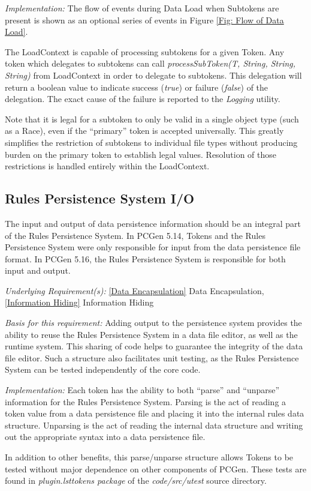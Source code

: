 \documentclass[12pt,letterpaper]{article}
\newcommand{\pcgenversEOS}{5.16}
\newcommand{\systemEOS}{Rules Persistence System}
\newcommand{\system}{\systemEOS{} }
\newcommand{\textem}[1]{\emph{#1}}
\newcommand{\lsubsection}[1]{\label{#1}\subsection{#1}}
\newcommand{\myref}[1]{\ref{#1} #1}
\newcommand{\basis}{\noindent\textem{Basis for this requirement:} }
\newcommand{\impl}{\noindent\textem{Implementation:} }
\newcommand{\under}{\noindent\textem{Underlying Requirement(s):} }
\begin{document}
\impl The flow of events during Data Load when Subtokens are present is shown as an optional
series of events in Figure \ref{Fig: Flow of Data Load}.

The LoadContext is capable of processing subtokens for a given Token.  Any token 
which delegates to subtokens can call \textem{processSubToken(T, String, String, String)}
from LoadContext in order to delegate to subtokens.  This delegation will return a boolean 
value to indicate success (\textem{true}) or failure (\textem{false}) of the delegation. 
The exact cause of the failure is reported to the \textem{Logging} utility.

Note that it is legal for a subtoken to only be valid in a single object type (such as
a Race), even if the ``primary'' token is accepted universally.  This greatly simplifies 
the restriction of subtokens to individual file types without producing burden on
the primary token to establish legal values.  Resolution of those restrictions is handled
entirely within the LoadContext.

\lsubsection{\system I/O}

The input and output of data persistence information should be an integral part of the
\systemEOS.  In PCGen 5.14, Tokens and the \system were only responsible for input from 
the data persistence file format.  In PCGen \pcgenversEOS, the \system is responsible
for both input and output.

\under \myref{Data Encapsulation}, \myref{Information Hiding}

\basis Adding output to the persistence system provides the ability to reuse the 
\system in a data file editor, as well as the runtime system.  This sharing
of code helps to guarantee the integrity of the data file editor.  Such a structure
also facilitates unit testing, as the \system can be tested independently
of the core code.

\impl Each token has the ability to both ``parse'' and ``unparse'' information 
for the \systemEOS.  Parsing is the act of reading a token value from a data 
persistence file and placing it into the internal rules data structure.  Unparsing
is the act of reading the internal data structure and writing out the appropriate
syntax into a data persistence file.

In addition to other benefits, this parse/unparse structure allows Tokens to be
tested without major dependence on other components of PCGen.  These tests are found in 
\textem{plugin.lsttokens package} of the \textem{code/src/utest} source directory.
\end{document}
